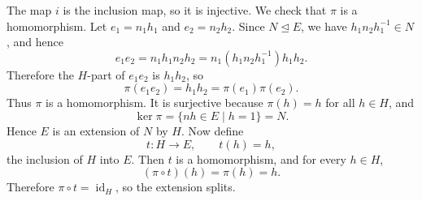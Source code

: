 \documentclass[../Odyssey_Project.tex]{subfiles}
\begin{document}
\begin{solution}
    The map $i$ is the inclusion map, so it is injective. We check that $\pi$ is a homomorphism. Let $e_1 = n_1h_1$ and $e_2 = n_2h_2$. Since $N \trianglelefteq E$, we have $h_1n_2h_1^{-1} \in N$, and hence
    \[
        e_1e_2
        =
        n_1h_1n_2h_2
        =
        n_1(h_1n_2h_1^{-1})h_1h_2.
    \]
    Therefore the $H$-part of $e_1e_2$ is $h_1h_2$, so
    \[
        \pi(e_1e_2) = h_1h_2 = \pi(e_1)\pi(e_2).
    \]
    Thus $\pi$ is a homomorphism. It is surjective because $\pi(h) = h$ for all $h \in H$, and
    \[
        \ker\pi = \{nh \in E \mid h = 1\} = N.
    \]
    Hence $E$ is an extension of $N$ by $H$. Now define
    \[
        t \colon H \to E,
        \qquad
        t(h) = h,
    \]
    the inclusion of $H$ into $E$. Then $t$ is a homomorphism, and for every $h \in H$,
    \[
        (\pi \circ t)(h) = \pi(h) = h.
    \]
    Therefore $\pi \circ t = \operatorname{id}_H$, so the extension splits.
\end{solution}
\end{document}
